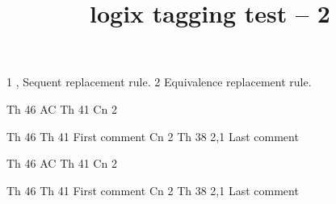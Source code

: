 \documentclass{article}
\title{logix tagging test -- 2}
\begin{document}
\begin{LogixDefn}[5em]
\end{LogixDefn}

\begin{LogixAxiom}[10em]
 {1} { \Equv {},  \Seq {}
\OpnBrkt {} \RightSlash {} \ClsBrkt }{ Sequent replacement rule. }
 {2} { \Equv {} \Seq {} \Equv {}
\OpnBrkt {} \RightSlash {} \ClsBrkt }
{ Equivalence replacement rule. }
\end{LogixAxiom}

\begin{LogixProof} {Th 46} {AC} { \Nd {}}
 {Th 41} {} { \Impl {}}
 {Cn 2} {} { \Impl {}}
\end{LogixProof}

\begin{LogixProof}[5em] {Th 46} {} { \Nd {}}
 {Th 41} {} { \Impl {}} {First comment}
 {Cn 2} {} { \Impl {}} {}
 {Th 38} {2,1} { \Impl {}} {Last comment}
\end{LogixProof}

\begin{LogixSeqnt} {Th 46} {AC} { \Seq {}}
 {Th 41} {} {} {}
 {Cn 2} {} {} {}
\end{LogixSeqnt}

\begin{LogixSeqnt}[3em] {Th 46} {} { \Seq {}}
 {Th 41} {} {} {} {First comment}
 {Cn 2} {} {} {} {}
 {Th 38} {2,1} { } {} {Last comment}
\end{LogixSeqnt}
\end{document}
